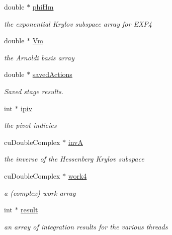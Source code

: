 \begin{DoxyCompactItemize}
double $\ast$ \hyperlink{structexprb43cu_1_1solver__memory_aebb83d142ab8d04edad3538544c67ec4}{phi\+Hm}
\begin{DoxyCompactList}\small\item\em the exponential Krylov subspace array for E\+X\+P4 \end{DoxyCompactList}\item 
double $\ast$ \hyperlink{structexprb43cu_1_1solver__memory_a3b68c5a632fe265037cd25195e266c65}{Vm}
\begin{DoxyCompactList}\small\item\em the Arnoldi basis array \end{DoxyCompactList}\item 
double $\ast$ \hyperlink{structexprb43cu_1_1solver__memory_aee268d381ce2f3ab02754793dfd068ee}{saved\+Actions}
\begin{DoxyCompactList}\small\item\em Saved stage results. \end{DoxyCompactList}\item 
int $\ast$ \hyperlink{structexprb43cu_1_1solver__memory_ad00e33aaa4241cc8356ea30869d311ff}{ipiv}
\begin{DoxyCompactList}\small\item\em the pivot indicies \end{DoxyCompactList}\item 
cu\+Double\+Complex $\ast$ \hyperlink{structexprb43cu_1_1solver__memory_a41d0878433e4e8e15ce8403b8efc8c23}{invA}
\begin{DoxyCompactList}\small\item\em the inverse of the Hessenberg Krylov subspace \end{DoxyCompactList}\item 
cu\+Double\+Complex $\ast$ \hyperlink{structexprb43cu_1_1solver__memory_a7db0969d6909faa9beb4965290c52a63}{work4}
\begin{DoxyCompactList}\small\item\em a (complex) work array \end{DoxyCompactList}\item 
int $\ast$ \hyperlink{structexprb43cu_1_1solver__memory_a69d7ae536d679306d284b461a8bdb2c3}{result}
\begin{DoxyCompactList}\small\item\em an array of integration results for the various threads \end{DoxyCompactList}\end{DoxyCompactItemize}


